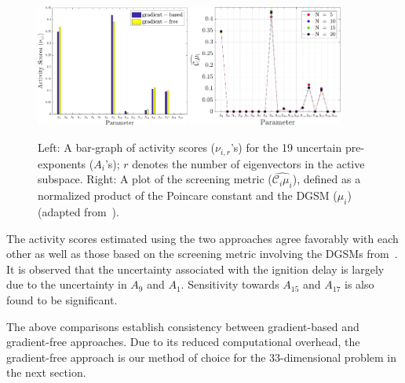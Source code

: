 %
\begin{figure}[htbp]
 \begin{center}
  \includegraphics[width=0.45\textwidth]{./Figures/comp_as}
  \includegraphics[width=0.45\textwidth]{./Figures/ub_conv_kinetics_rich}
\caption{Left: A bar-graph of activity scores ($\nu_{i,r}$'s) for the 19 uncertain pre-exponents ($A_i$'s); $r$
denotes the number of eigenvectors in the active subspace.
Right: A plot of the screening metric ($\widehat{\mathcal{C}_i\mu_i}$), defined as a normalized product of the
Poincare constant and the DGSM ($\mu_i$) (adapted from~\cite{Vohra:2018}).}
\label{fig:comp_as}
\end{center}
\end{figure}
%
The activity scores estimated using the two approaches agree favorably with each other as well as those
based on the screening metric involving the DGSMs from~\cite{Vohra:2018}. It is observed that the uncertainty
associated with the ignition delay is largely due to the uncertainty in $A_9$ and $A_1$. Sensitivity towards
$A_{15}$ and $A_{17}$ is also found to be significant. 

The above comparisons establish consistency between gradient-based and
gradient-free approaches. Due to its reduced computational overhead, the
gradient-free approach is our method of choice for the 33-dimensional problem
in the next section. 


